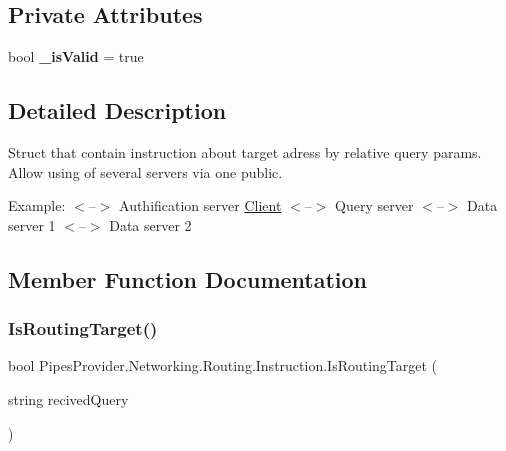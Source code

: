 \subsection*{Private Attributes}
\begin{DoxyCompactItemize}
\item 
\mbox{\label{class_pipes_provider_1_1_networking_1_1_routing_1_1_instruction_abcd8b85ff0383ecd73b24befa9d69506}} 
bool {\bfseries \+\_\+is\+Valid} = true
\end{DoxyCompactItemize}


\subsection{Detailed Description}


Struct that contain instruction about target adress by relative query params. Allow using of several servers via one public.

Example\+: $<$--$>$ Authification server \mbox{\hyperlink{namespace_pipes_provider_1_1_client}{Client}} $<$--$>$ Query server $<$--$>$ Data server 1 $<$--$>$ Data server 2 

\subsection{Member Function Documentation}
\mbox{\label{class_pipes_provider_1_1_networking_1_1_routing_1_1_instruction_a376135eac06c59b1df8d2f5d1617bed9}} 
\subsubsection{\texorpdfstring{Is\+Routing\+Target()}{IsRoutingTarget()}}
{\footnotesize\ttfamily bool Pipes\+Provider.\+Networking.\+Routing.\+Instruction.\+Is\+Routing\+Target (\begin{DoxyParamCaption}\item[{string}]{recived\+Query }\end{DoxyParamCaption})}




